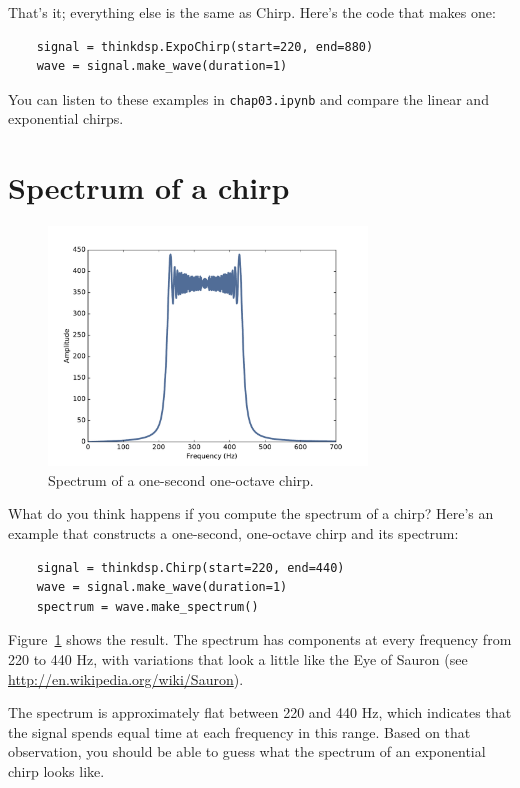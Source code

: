 \documentclass[12pt]{book}
\begin{document}
That's it; everything else is the same as Chirp.  Here's the code
that makes one:

\begin{verbatim}
    signal = thinkdsp.ExpoChirp(start=220, end=880)
    wave = signal.make_wave(duration=1)
\end{verbatim}

You can listen to these examples in {\tt chap03.ipynb} and compare
the linear and exponential chirps.


\section{Spectrum of a chirp}
\label{sauron}

\begin{figure}
\centerline{\includegraphics[height=2.5in]{figs/chirp1.pdf}}
\caption{Spectrum of a one-second one-octave chirp.}
\label{fig.chirp1}
\end{figure}

What do you think happens if you compute the spectrum of a chirp?
Here's an example that constructs a one-second, one-octave chirp and
its spectrum:

\begin{verbatim}
    signal = thinkdsp.Chirp(start=220, end=440)
    wave = signal.make_wave(duration=1)
    spectrum = wave.make_spectrum()
\end{verbatim}

Figure~\ref{fig.chirp1} shows the result.  The spectrum has
components at every frequency from 220 to 440 Hz, with variations
that look a little like the Eye of Sauron
(see \url{http://en.wikipedia.org/wiki/Sauron}).

The spectrum is approximately flat between 220 and 440 Hz, which
indicates that the signal spends equal time at each frequency in this
range.  Based on that observation, you should be able to guess what
the spectrum of an exponential chirp looks like.
\end{document}
